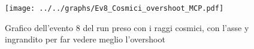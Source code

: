 \begin{figure}[h] \centering \texttt{[image: ../../graphs/Ev8\_Cosmici\_overshoot\_MCP.pdf]}\caption{Grafico dell'evento 8 del run preso con i raggi cosmici, con l'asse y ingrandito per far vedere meglio l'overshoot}\label{gr:Ev8_Cosmici_overshoot_MCP} \end{figure}
